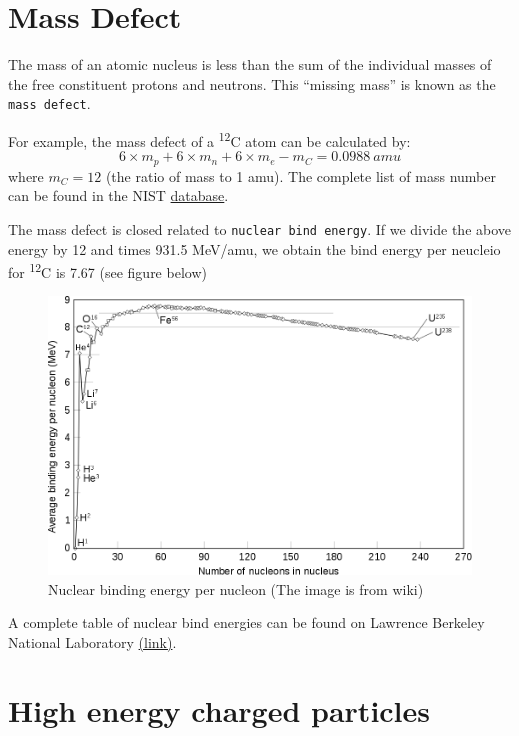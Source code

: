 \documentclass[]{book}
\theoremstyle{definition}
\theoremstyle{definition}
\theoremstyle{definition}
\theoremstyle{remark}
\begin{document}
\section{Mass Defect}\label{mass-defect}

The mass of an atomic nucleus is less than the sum of the individual
masses of the free constituent protons and neutrons. This ``missing
mass'' is known as the \texttt{mass\ defect}.

For example, the mass defect of a \textsuperscript{12}C atom can be
calculated by:
\[ 6 \times m_p + 6 \times m_n + 6 \times m_e - m_{C} = 0.0988\ amu\]
where \(m_C = 12\) (the ratio of mass to 1 amu). The complete list of
mass number can be found in the NIST
\href{https://physics.nist.gov/cgi-bin/Compositions/stand_alone.pl}{database}.

The mass defect is closed related to \texttt{nuclear\ bind\ energy}. If
we divide the above energy by 12 and times 931.5 MeV/amu, we obtain the
bind energy per neucleio for \textsuperscript{12}C is 7.67 (see figure
below)

\begin{figure}

{\centering \includegraphics{figures/binding_energy} 

}

\caption{Nuclear binding energy per nucleon (The image is from wiki)}\label{fig:unnamed-chunk-4}
\end{figure}

A complete table of nuclear bind energies can be found on Lawrence
Berkeley National Laboratory
\href{http://xdb.lbl.gov/Section1/Table_1-1.pdf}{(link)}.

\section{High energy charged particles}\label{einstein}
\end{document}
